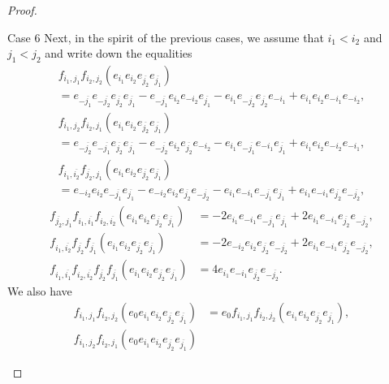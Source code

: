 \documentclass[10pt,a4paper]{article}
\theoremstyle{remark}\newtheorem{rema}[theo]{Remark}
\newenvironment{enonce*}[2][]{\par\smallskip\noindent\textbf{#2.}\ }{\par\smallskip}
\begin{document}
\begin{proof}
\begin{enonce*}[remark]{Case 6}
Next, in the spirit of the previous cases, we assume that $i_1<i_2$ and $j_1<j_2$ and write down the equalities
\begin{multline*}
f_{i_1,j_1}f_{i_2,j_2}(e_{i_1}e_{i_2}e_{\overline{j_2}}e_{\overline{j_1}})
\\
=e_{-\overline{j_1}}e_{-\overline{j_2}}e_{\overline{j_2}}e_{\overline{j_1}}-e_{-\overline{j_1}}e_{i_2}e_{-i_2}e_{\overline{j_1}}-e_{i_1}e_{-\overline{j_2}}e_{\overline{j_2}}e_{-i_1}+e_{i_1}e_{i_2}e_{-i_1}e_{-i_2},
\end{multline*}
\begin{multline*}
f_{i_1,j_2}f_{i_2,j_1}(e_{i_1}e_{i_2}e_{\overline{j_2}}e_{\overline{j_1}})
\\
=e_{-\overline{j_2}}e_{-\overline{j_1}}e_{\overline{j_2}}e_{\overline{j_1}}-e_{-\overline{j_2}}e_{i_2}e_{\overline{j_2}}e_{-i_2}-e_{i_1}e_{-\overline{j_1}}e_{-i_1}e_{\overline{j_1}}+e_{i_1}e_{i_2}e_{-i_2}e_{-i_1},
\end{multline*}
\begin{multline*}
f_{i_1,\overline{i_2}}f_{\overline{j_2},j_1}(e_{i_1}e_{i_2}e_{\overline{j_2}}e_{\overline{j_1}})\\
=e_{-i_2}e_{i_2}e_{-\overline{j_1}}e_{\overline{j_1}}-e_{-i_2}e_{i_2}e_{\overline{j_2}}e_{-\overline{j_2}}-e_{i_1}e_{-i_1}e_{-\overline{j_1}}e_{\overline{j_1}}+e_{i_1}e_{-i_1}e_{\overline{j_2}}e_{-\overline{j_2}},
\end{multline*}
\begin{align*}
f_{\overline{j_2},j_1}f_{i_1,\overline{i_1}}f_{i_2,\overline{i_2}}(e_{i_1}e_{i_2}e_{\overline{j_2}}e_{\overline{j_1}})
&=-2e_{i_1}e_{-i_1}e_{-\overline{j_1}}e_{\overline{j_1}}+2e_{i_1}e_{-i_1}e_{\overline{j_2}}e_{-\overline{j_2}},
\\
f_{i_1,\overline{i_2}}f_{\overline{j_2}}f_{\overline{j_1}}(e_{i_1}e_{i_2}e_{\overline{j_2}}e_{\overline{j_1}})
&=-2e_{-i_2}e_{i_2}e_{\overline{j_2}}e_{-\overline{j_2}}+2e_{i_1}e_{-i_1}e_{\overline{j_2}}e_{-\overline{j_2}},
\\
f_{i_1,\overline{i_1}}f_{i_2,\overline{i_2}}f_{\overline{j_2}}f_{\overline{j_1}}(e_{i_1}e_{i_2}e_{\overline{j_2}}e_{\overline{j_1}})
&=4e_{i_1}e_{-i_1}e_{\overline{j_2}}e_{-\overline{j_2}}.
\end{align*}
We also have
\begin{align*}
f_{i_1,j_1}f_{i_2,j_2}(e_0e_{i_1}e_{i_2}e_{\overline{j_2}}e_{\overline{j_1}})
&=e_0f_{i_1,j_1}f_{i_2,j_2}(e_{i_1}e_{i_2}e_{\overline{j_2}}e_{\overline{j_1}}),
\\
f_{i_1,j_2}f_{i_2,j_1}(e_0e_{i_1}e_{i_2}e_{\overline{j_2}}e_{\overline{j_1}})

\end{align*}
\end{enonce*}
\end{proof}
\end{document}
